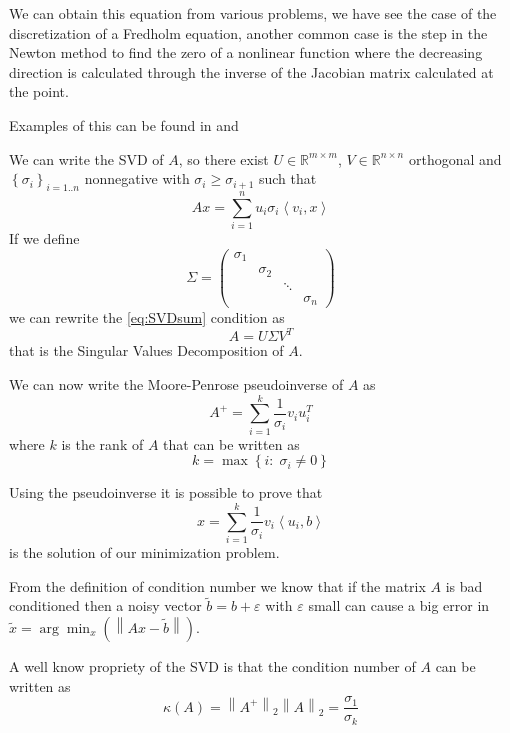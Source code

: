 \documentclass[a4paper,10pt]{article}
\theoremstyle{plain}
\theoremstyle{definition}
\theoremstyle{remark}
\newcommand{\set}[1]{\left\{#1\right\}}
\newcommand{\pa}[1]{\left(#1\right)}
\newcommand{\ang}[1]{\left<#1\right>}
\newcommand{\norm}[1]{\left\|#1\right\|}
\begin{document}
We can obtain this equation from various problems, we have see the
case of the discretization of a Fredholm equation, another common case
is the step in the Newton method to find the zero of a nonlinear
function where the decreasing direction is calculated through the
inverse of the Jacobian matrix calculated at the point.

Examples of this can be found in \cite{inversesturm} and \cite{atmospheric}

We can write the SVD of $A$, so there exist $U\in \mathbb{R}^{m\times
  m}$, $V\in \mathbb{R}^{n\times n}$ orthogonal and $\set{\sigma
  _i}_{i=1..n}$ nonnegative with $\sigma _i \ge \sigma _{i+1}$ such that
\begin{equation}
  \label{eq:SVDsum}
  Ax = \sum _{i=1} ^n u_i \sigma _i \ang{v_i,x}
\end{equation}
If we define
\[ \Sigma = \begin{pmatrix}
\sigma _1 & & & \\
& \sigma _2 & &  \\
& & \ddots & \\
& & & \sigma _n 
\end{pmatrix} \]
we can rewrite the \ref{eq:SVDsum} condition as
\begin{equation}
  \label{eq:SVDmat}
  A = U\Sigma V^T
\end{equation}
that is the Singular Values Decomposition of $A$.

We can now write the Moore-Penrose pseudoinverse of $A$ as
\begin{equation}
  \label{eq:pseudoinverse}
  A^+ = \sum _{i=1} ^k \frac{1}{\sigma _i} v_i u_i ^T 
\end{equation}
where $k$ is the rank of $A$ that can be written as
\[ k = \max \set{ i :\; \sigma_i \neq 0 } \]

Using the pseudoinverse it is possible to prove that
\begin{equation}
  \label{eq:inverseSVDunreg}
  x = \sum _{i=1} ^k \frac{1}{\sigma _i} v_i \ang{u_i,b}
\end{equation}
is the solution of our minimization problem.

From the definition of condition number we know that if the matrix $A$
is bad conditioned then a noisy vector $\tilde b = b + \varepsilon$
with $\varepsilon$ small can cause a big error in $\tilde x = \arg\min _{x}
\pa{ \norm{ Ax - \tilde b }}$.

A well know propriety of the SVD is that the condition number of $A$
can be written as
\[ \kappa (A) = \norm{A^+}_2\norm{A}_2 = \frac{\sigma _1}{\sigma _k} \]
\end{document}
